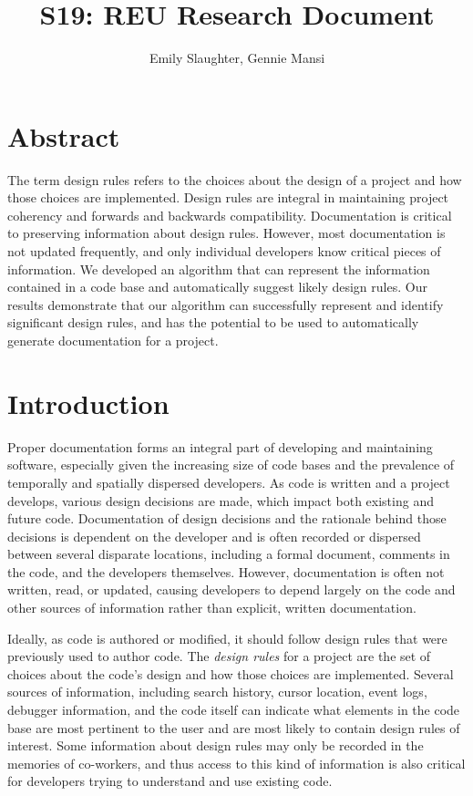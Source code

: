 \documentclass[12pt]{article}
\title{S19: REU Research Document}
\author{Emily Slaughter, Gennie Mansi }
\begin{document}
\maketitle

\clearpage

\tableofcontents

\clearpage

\section{Abstract} \label{abstract}

The term design rules refers to the choices about the design of a project and how those choices are implemented. Design rules are integral in maintaining project coherency and forwards and backwards compatibility. Documentation is critical to preserving information about design rules. However, most documentation is not updated frequently, and only individual developers know critical pieces of information. We developed an algorithm that can represent the information contained in a code base and automatically suggest likely design rules. Our results demonstrate that our algorithm can successfully represent and identify significant design rules, and has the potential to be used to automatically generate documentation for a project.



\clearpage
\section{Introduction} \label{intro}

Proper documentation forms an integral part of developing and maintaining software, especially given the increasing size of code bases and the prevalence of temporally and spatially dispersed developers. As code is written and a project develops, various design decisions are made, which impact both existing and future code. Documentation of design decisions and the rationale behind those decisions is dependent on the developer and is often recorded or dispersed between several disparate locations, including a formal document, comments in the code, and the developers themselves. However, documentation is often not written, read, or updated, causing developers to depend largely on the code and other sources of information rather than explicit, written documentation. 

Ideally, as code is authored or modified, it should follow design rules that were previously used to author code. The \textit{design rules} for a project are the set of choices about the code's design and how those choices are implemented. Several sources of information, including search history, cursor location, event logs, debugger information, and the code itself can indicate what elements in the code base are most pertinent to the user and are most likely to contain design rules of interest. Some information about design rules may only be recorded in the memories of co-workers, and thus access to this kind of information is also critical for developers trying to understand and use existing code. 
\end{document}
